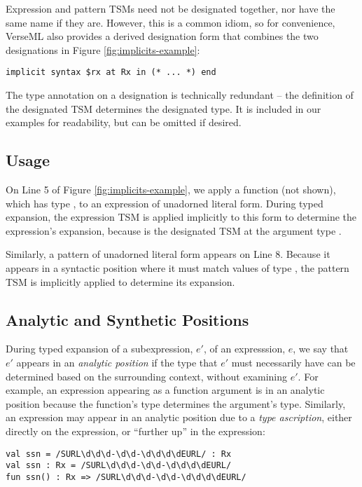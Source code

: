 Expression and pattern TSMs need not be designated together, nor have the same name if they are. However, this is a common idiom, so for convenience, VerseML also provides a derived designation form that combines the two designations in Figure \ref{fig:implicits-example}:
\begin{lstlisting}[numbers=none]
implicit syntax $rx at Rx in (* ... *) end 
\end{lstlisting}

The type annotation on a designation is technically redundant -- the definition of the designated TSM determines the designated type. It is included in our examples for readability, but can be omitted if desired.

\subsection{Usage}

On Line 5 of Figure \ref{fig:implicits-example}, we apply a function  (not shown), which has type , to an expression of unadorned literal form. During typed expansion, the expression TSM  is applied implicitly to this form to determine the expression's expansion,  because  is the designated TSM at the argument type . %

Similarly, a pattern of unadorned literal form appears on Line 8. Because it appears in a syntactic position where it must match values of type , the pattern TSM  is implicitly applied to determine its expansion.

\subsection{Analytic and Synthetic Positions}
During typed expansion of a subexpression, $e'$, of an expresssion, $e$, we say that $e'$ appears in an \emph{analytic position} if the type that $e'$ must necessarily have can be determined based on the surrounding context, without examining $e'$. For example, an expression appearing as a function argument is in an analytic position because the function's type determines the argument's type. Similarly, an expression may appear in an analytic position due to a \emph{type ascription}, either directly on the expression, or ``further up'' in the expression:
\begin{lstlisting}[numbers=none]
val ssn = /SURL\d\d\d-\d\d-\d\d\d\dEURL/ : Rx
val ssn : Rx = /SURL\d\d\d-\d\d-\d\d\d\dEURL/
fun ssn() : Rx => /SURL\d\d\d-\d\d-\d\d\d\dEURL/
\end{lstlisting}


